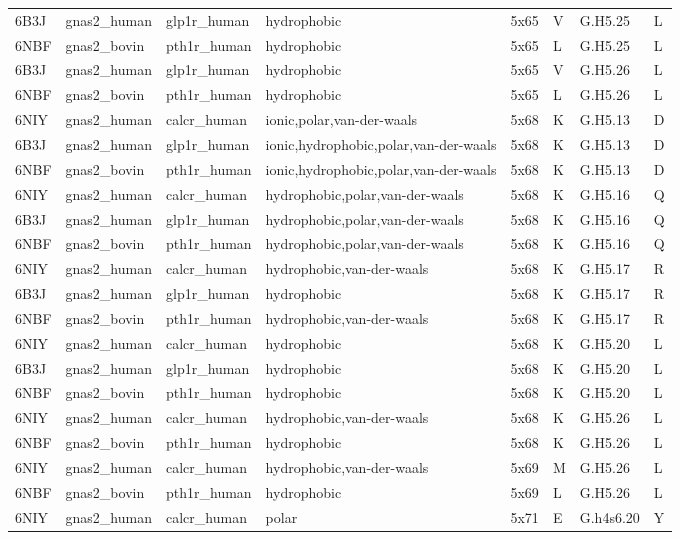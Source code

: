 \begin{landscape}
\begin{longtable}{llllllll}
6B3J & gnas2\_human & glp1r\_human & hydrophobic & 5x65 & V & G.H5.25 & L\\
6NBF & gnas2\_bovin & pth1r\_human & hydrophobic & 5x65 & L & G.H5.25 & L\\
6B3J & gnas2\_human & glp1r\_human & hydrophobic & 5x65 & V & G.H5.26 & L\\
6NBF & gnas2\_bovin & pth1r\_human & hydrophobic & 5x65 & L & G.H5.26 & L\\
\addlinespace
6NIY & gnas2\_human & calcr\_human & ionic,polar,van-der-waals & 5x68 & K & G.H5.13 & D\\
6B3J & gnas2\_human & glp1r\_human & ionic,hydrophobic,polar,van-der-waals & 5x68 & K & G.H5.13 & D\\
6NBF & gnas2\_bovin & pth1r\_human & ionic,hydrophobic,polar,van-der-waals & 5x68 & K & G.H5.13 & D\\
6NIY & gnas2\_human & calcr\_human & hydrophobic,polar,van-der-waals & 5x68 & K & G.H5.16 & Q\\
6B3J & gnas2\_human & glp1r\_human & hydrophobic,polar,van-der-waals & 5x68 & K & G.H5.16 & Q\\
\addlinespace
6NBF & gnas2\_bovin & pth1r\_human & hydrophobic,polar,van-der-waals & 5x68 & K & G.H5.16 & Q\\
6NIY & gnas2\_human & calcr\_human & hydrophobic,van-der-waals & 5x68 & K & G.H5.17 & R\\
6B3J & gnas2\_human & glp1r\_human & hydrophobic & 5x68 & K & G.H5.17 & R\\
6NBF & gnas2\_bovin & pth1r\_human & hydrophobic,van-der-waals & 5x68 & K & G.H5.17 & R\\
6NIY & gnas2\_human & calcr\_human & hydrophobic & 5x68 & K & G.H5.20 & L\\
\addlinespace
6B3J & gnas2\_human & glp1r\_human & hydrophobic & 5x68 & K & G.H5.20 & L\\
6NBF & gnas2\_bovin & pth1r\_human & hydrophobic & 5x68 & K & G.H5.20 & L\\
6NIY & gnas2\_human & calcr\_human & hydrophobic,van-der-waals & 5x68 & K & G.H5.26 & L\\
6NBF & gnas2\_bovin & pth1r\_human & hydrophobic & 5x68 & K & G.H5.26 & L\\
6NIY & gnas2\_human & calcr\_human & hydrophobic,van-der-waals & 5x69 & M & G.H5.26 & L\\
\addlinespace
6NBF & gnas2\_bovin & pth1r\_human & hydrophobic & 5x69 & L & G.H5.26 & L\\
6NIY & gnas2\_human & calcr\_human & polar & 5x71 & E & G.h4s6.20 & Y\\

\end{longtable}
\end{landscape}
